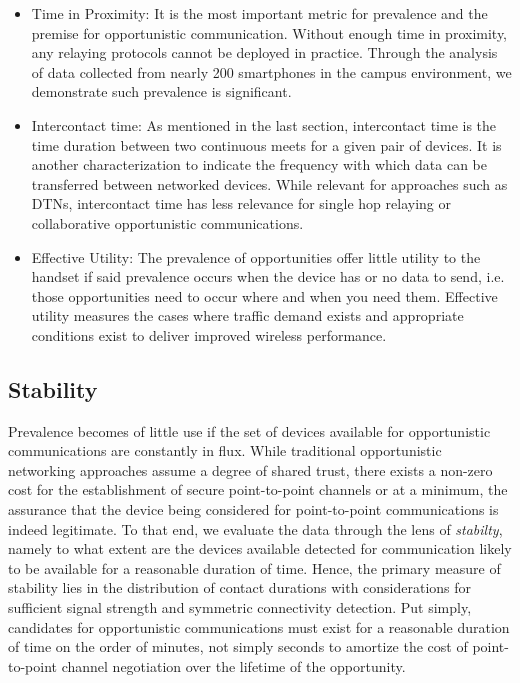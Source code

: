 \begin{itemize}
	\item Time in Proximity: It is the most important metric for prevalence and the premise for opportunistic communication. Without enough time in proximity, any relaying protocols cannot be deployed in practice. Through the analysis of data collected from nearly 200 smartphones in the campus environment, we demonstrate such prevalence is significant. 
	\item Intercontact time: As mentioned in the last section, intercontact time is the time duration between two continuous meets for a given pair of devices. It is another characterization to indicate the frequency with which data can be transferred between networked devices.  While relevant for approaches such as DTNs, intercontact time has less relevance for single hop relaying or collaborative opportunistic communications.  
	\item Effective Utility: The prevalence of opportunities offer little utility to the handset if said prevalence occurs when the device has or no data to send, i.e. those opportunities need to occur where and when you need them.  Effective utility measures the cases where traffic demand exists and appropriate conditions exist to deliver improved wireless performance.       
\end{itemize} 

\subsection{Stability}

Prevalence becomes of little use if the set of devices available for opportunistic communications are constantly in flux.  While traditional opportunistic networking approaches assume a degree of shared trust, there exists a non-zero cost for the establishment of secure point-to-point channels or at a minimum, the assurance that the device being considered for point-to-point communications is indeed legitimate.  To that end, we evaluate the data through the lens of \emph{stabilty}, namely to what extent are the devices available detected for communication likely to be available for a reasonable duration of time.  Hence, the primary measure of stability lies in the distribution of contact durations with considerations for sufficient signal strength and symmetric connectivity detection.  Put simply, candidates for opportunistic communications must exist for a reasonable duration of time on the order of minutes, not simply seconds to amortize the cost of point-to-point channel negotiation over the lifetime of the opportunity.       

